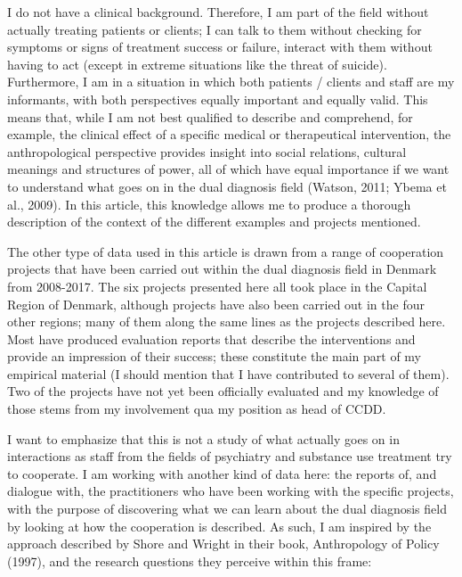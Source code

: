 \begin{multicols}{2}
I do not have a clinical background. Therefore, I am part of the field without actually treating patients or clients; I can talk to them without checking for symptoms or signs of treatment success or failure, interact with them without having to act (except in extreme situations like the threat of suicide). Furthermore, I am in a situation in which both patients / clients and staff are my informants, with both perspectives equally important and equally valid. This means that, while I am not best qualified to describe and comprehend, for example, the clinical effect of a specific medical or therapeutical intervention, the anthropological perspective provides insight into social relations, cultural meanings and structures of power, all of which have equal importance if we want to understand what goes on in the dual diagnosis field (Watson, 2011; Ybema et al., 2009). In this article, this knowledge allows me to produce a thorough description of the context of the different examples and projects mentioned.
\par
The other type of data used in this article is drawn from a range of cooperation projects that have been carried out within the dual diagnosis field in Denmark from 2008-2017.%
The six projects presented here all took place in the Capital Region of Denmark, although projects have also been carried out in the four other regions; many of them along the same lines as the projects described here. Most have produced evaluation reports that describe the interventions and provide an impression of their success; these constitute the main part of my empirical material (I should mention that I have contributed to several of them). Two of the projects have not yet been officially evaluated and my knowledge of those stems from my involvement qua my position as head of CCDD.
\par
I want to emphasize that this is not a study of what actually goes on in interactions as staff from the fields of psychiatry and substance use treatment try to cooperate. I am working with another kind of data here: the reports of, and dialogue with, the practitioners who have been working with the specific projects, with the purpose of discovering what we can learn about the dual diagnosis field by looking at how the cooperation is described. As such, I am inspired by the approach described by Shore and Wright in their book, Anthropology of Policy (1997), and the research questions they perceive within this frame:

\end{multicols}
